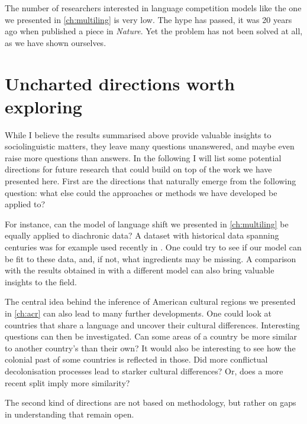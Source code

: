 \documentclass[../thesis.tex]{subfiles}
\begin{document}
The number of researchers interested in language competition models like the one we
presented in \cref{ch:multiling} is very low. The hype has passed, it was 20 years ago
when \citeauthor{AbramsModellingDynamics2003} published a piece in \textit{Nature}. Yet
the problem has not been solved at all, as we have shown ourselves. 



\section{Uncharted directions worth exploring}
While I believe the results summarised above provide valuable insights to
sociolinguistic matters, they leave many questions unanswered, and maybe even raise more
questions than answers. In the following I will list some potential directions for
future research that could build on top of the work we have presented here. First are
the directions that naturally emerge from the following question: what else could the
approaches or methods we have developed be applied to?

For instance, can the model of language shift we presented in \cref{ch:multiling} be
equally applied to diachronic data? A dataset with historical data spanning centuries
was for example used recently in \cite{SeoaneAreDutch2022}. One could try to see if our
model can be fit to these data, and, if not, what ingredients may be missing. A
comparison with the results obtained in \cite{SeoaneAreDutch2022} with a different model
can also bring valuable insights to the field. 

The central idea behind the inference of American cultural regions we presented in
\cref{ch:acr} can also lead to many further developments. One could look at countries
that share a language and uncover their cultural differences. Interesting questions can
then be investigated. Can some areas of a country be more similar to another country's
than their own? It would also be interesting to see how the colonial past of some
countries is reflected in those. Did more conflictual decolonisation processes lead to
starker cultural differences? Or, does a more recent split imply more similarity?

The second kind of directions are not based on methodology, but rather on gaps in
understanding that remain open.
\end{document}
